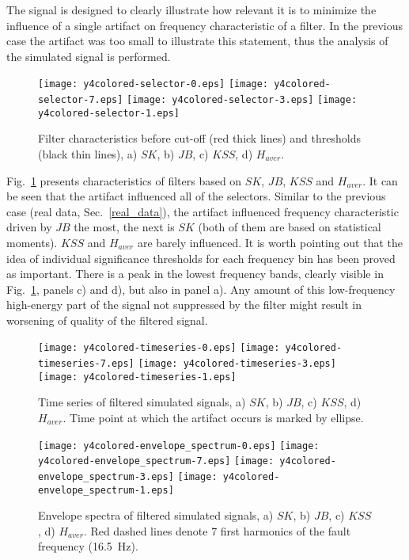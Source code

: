 \documentclass[11pt]{article} %
\begin{document}
The signal is designed to clearly illustrate how relevant it is to minimize the influence of a single artifact on frequency characteristic of a filter. In the previous case the artifact was too small to illustrate this statement, thus the analysis of the simulated signal is performed.\\
\begin{figure}[!ht]
\begin{center}
\texttt{[image: y4colored-selector-0.eps]}
\texttt{[image: y4colored-selector-7.eps]}
\texttt{[image: y4colored-selector-3.eps]}
\texttt{[image: y4colored-selector-1.eps]}
\caption{Filter characteristics before cut-off (red thick lines) and thresholds (black thin lines), a) $SK$, b) $JB$, c) $KSS$, d) $H_{aver}$.\label{f:selectors-y4}}
\end{center}
\end{figure}
Fig.~\ref{f:selectors-y4} presents characteristics of filters based on $SK$, $JB$, $KSS$ and $H_{aver}$. It can be seen that the artifact influenced all of the selectors. Similar to the previous case (real data, Sec.~\ref{real_data}), the artifact influenced frequency characteristic driven by $JB$ the most, the next is $SK$ (both of them are based on statistical moments). $KSS$ and $H_{aver}$ are barely influenced. It is worth pointing out that the idea of individual significance thresholds for each frequency bin has been proved as important. There is a peak in the lowest frequency bands, clearly visible in Fig.~\ref{f:selectors-y4}, panels c) and d), but also in panel a). Any amount of this low-frequency high-energy part of the signal not suppressed by the filter might result in worsening of quality of the filtered signal.\\
\begin{figure}[!ht]
\begin{center}
\texttt{[image: y4colored-timeseries-0.eps]}
\texttt{[image: y4colored-timeseries-7.eps]}
\texttt{[image: y4colored-timeseries-3.eps]}
\texttt{[image: y4colored-timeseries-1.eps]}
\caption{Time series of filtered simulated signals, a) $SK$, b) $JB$, c) $KSS$, d) $H_{aver}$. Time point at which the artifact occurs is marked by ellipse.\label{f:timeseries_filtered-y4}}
\texttt{[image: y4colored-envelope\_spectrum-0.eps]}
\texttt{[image: y4colored-envelope\_spectrum-7.eps]}
\texttt{[image: y4colored-envelope\_spectrum-3.eps]}
\texttt{[image: y4colored-envelope\_spectrum-1.eps]}
\caption{Envelope spectra of filtered simulated signals, a) $SK$, b) $JB$, c) $KSS$, d) $H_{aver}$. Red dashed lines denote 7 first harmonics of the fault frequency (16.5~Hz).\label{f:spectra_filtered-y4}}
\end{center}
\end{figure}
\end{document}
